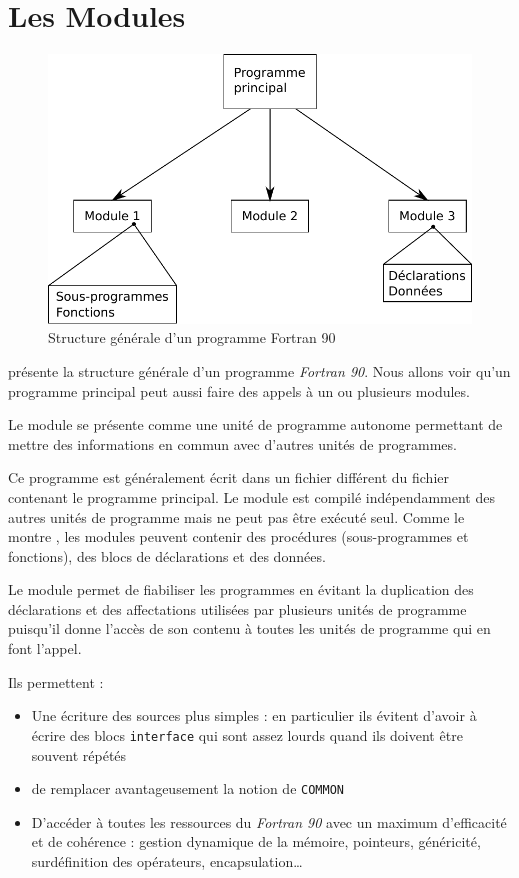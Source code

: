 \documentclass[a4paper,twoside]{article}
\begin{document}
\section{Les Modules}

\begin{figure}[htb]
\centering
\includegraphics[width=0.65\linewidth]{figure/structure_programme.pdf}
\caption{Structure générale d'un programme Fortran 90}\label{fig:structure_programme}
\end{figure}

 présente la structure générale d'un programme \emph{Fortran 90}. Nous allons voir qu'un programme principal peut aussi faire des appels à un ou plusieurs modules. 

\begin{definition}
Le module se présente comme une unité de programme autonome permettant de mettre des informations en commun avec d'autres unités de programmes. 
\end{definition}


Ce programme est généralement écrit dans un fichier différent du fichier contenant le programme principal. Le module est compilé indépendamment des autres unités de programme mais ne peut pas être exécuté seul. Comme le montre , les modules peuvent contenir des procédures (sous-programmes et fonctions), des blocs de déclarations et des données. 

Le module permet de fiabiliser les programmes en évitant la duplication des déclarations et des affectations utilisées par plusieurs unités de programme puisqu'il donne l'accès de son contenu à toutes les unités de programme qui en font l'appel.

Ils permettent : 
\begin{itemize}
\item Une écriture des sources plus simples : en particulier ils évitent d'avoir à écrire des blocs \texttt{interface} qui sont assez lourds quand ils doivent être souvent répétés
\item de remplacer avantageusement la notion de \texttt{COMMON}
\item D'accéder à toutes les ressources du \emph{Fortran 90} avec un maximum d'efficacité et de cohérence : gestion dynamique de la mémoire, pointeurs, généricité, surdéfinition des opérateurs, encapsulation\dots
\end{itemize}
\end{document}

